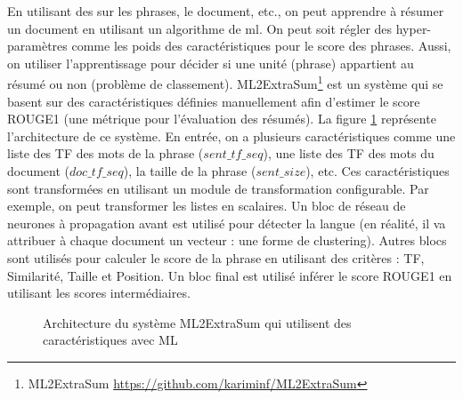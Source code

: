 \documentclass{KodeBook}
\begin{document}
En utilisant des  sur les phrases, le document, etc., on peut apprendre à résumer un document en utilisant un algorithme de \ac{ml}.
On peut soit régler des hyper-paramètres comme les poids des caractéristiques pour le score des phrases. 
Aussi, on utiliser l'apprentissage pour décider si une unité (phrase) appartient au résumé ou non (problème de classement). 
ML2ExtraSum\footnote{ML2ExtraSum \url{https://github.com/kariminf/ML2ExtraSum}} \cite{2020-aries} est un système qui se basent sur des caractéristiques définies manuellement afin d'estimer le score ROUGE1 (une métrique pour l'évaluation des résumés).
La figure \ref{fig:ats-ml2es} représente l'architecture de ce système.
En entrée, on a plusieurs caractéristiques comme une liste des TF des mots de la phrase ($sent\_tf\_seq$), une liste des TF des mots du document ($doc\_tf\_seq$), la taille de la phrase ($sent\_size$), etc.
Ces caractéristiques sont transformées en utilisant un module de transformation configurable. 
Par exemple, on peut transformer les listes en scalaires. 
Un bloc de réseau de neurones à propagation avant est utilisé pour détecter la langue (en réalité, il va attribuer à chaque document un vecteur : une forme de clustering).
Autres blocs sont utilisés pour calculer le score de la phrase en utilisant des critères : TF, Similarité, Taille et Position. 
Un bloc final est utilisé inférer le score ROUGE1 en utilisant les scores intermédiaires. 

\begin{figure}[!ht]
	\centering
	\caption{Architecture du système ML2ExtraSum qui utilisent des caractéristiques avec ML \cite{2020-aries}}
	\label{fig:ats-ml2es}
\end{figure}
\end{document}
